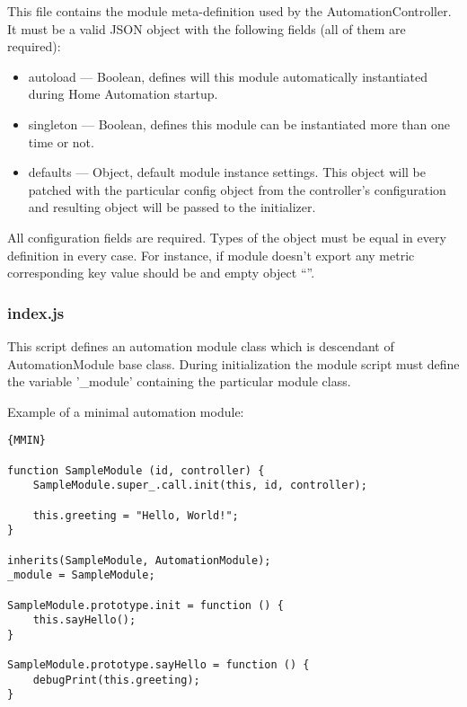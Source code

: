 This file contains the module meta-definition used by the AutomationController. It must be a valid JSON object with the following fields (all of them are required):
\begin{itemize}
\item autoload — Boolean, defines will this module automatically instantiated during Home Automation startup.
\item singleton — Boolean, defines this module can be instantiated more than one time or not.
\item defaults — Object, default module instance settings. This object will be patched with the particular 
config object from the controller's configuration and resulting object will be passed to the initializer.
\end{itemize}
All configuration fields are required. Types of the object must be equal in every definition in every case. For instance, if module doesn't export any metric corresponding key value should be and empty object “{}”.

\subsubsection{index.js}
 
This script defines an automation module class which is descendant of AutomationModule base class.
During initialization the module script must define the variable '\_module' containing the particular module class.


Example of a minimal automation module:

\begin{lstlisting}[caption=Minimal Module]{MMIN}

function SampleModule (id, controller) {
    SampleModule.super_.call.init(this, id, controller);

    this.greeting = "Hello, World!";
}

inherits(SampleModule, AutomationModule);
_module = SampleModule;

SampleModule.prototype.init = function () {
    this.sayHello();
}

SampleModule.prototype.sayHello = function () {
    debugPrint(this.greeting);
} 

\end{lstlisting} 
 
